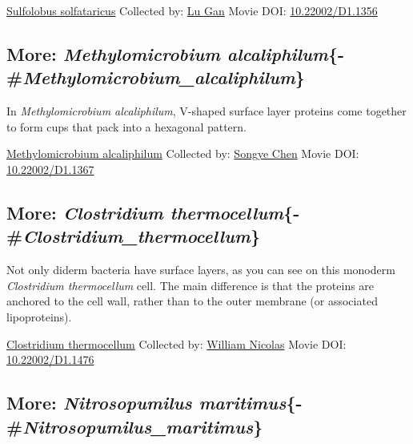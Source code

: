 \documentclass[]{tufte-book}
\begin{document}
\label{fig:2-7}\protect\hyperlink{tree}{Sulfolobus solfataricus} Collected by: \protect\hyperlink{lu_gan}{Lu Gan} Movie DOI: \href{https://doi.org/10.22002/D1.1356}{10.22002/D1.1356}

\hypertarget{more-methylomicrobium-alcaliphilum-methylomicrobium_alcaliphilum}{%
\subsection{\texorpdfstring{More: \emph{Methylomicrobium alcaliphilum}\{-\#\emph{Methylomicrobium\_alcaliphilum}\}}{More: Methylomicrobium alcaliphilum\{-\#Methylomicrobium\_alcaliphilum\}}}\label{more-methylomicrobium-alcaliphilum-methylomicrobium_alcaliphilum}}

In \emph{Methylomicrobium alcaliphilum}, V-shaped surface layer proteins come together to form cups that pack into a hexagonal pattern.



\hypertarget{htmlwidget-3ed617eb24cde7c86ec5}{}

\label{fig:2-7a}\protect\hyperlink{tree}{Methylomicrobium alcaliphilum} Collected by: \protect\hyperlink{songye_chen}{Songye Chen} Movie DOI: \href{https://doi.org/10.22002/D1.1367}{10.22002/D1.1367}

\hypertarget{more-clostridium-thermocellum-clostridium_thermocellum}{%
\subsection{\texorpdfstring{More: \emph{Clostridium thermocellum}\{-\#\emph{Clostridium\_thermocellum}\}}{More: Clostridium thermocellum\{-\#Clostridium\_thermocellum\}}}\label{more-clostridium-thermocellum-clostridium_thermocellum}}

Not only diderm bacteria have surface layers, as you can see on this monoderm \emph{Clostridium thermocellum} cell. The main difference is that the proteins are anchored to the cell wall, rather than to the outer membrane (or associated lipoproteins).



\hypertarget{htmlwidget-c2640723b2849eff1dcf}{}

\label{fig:2-7b}\protect\hyperlink{tree}{Clostridium thermocellum} Collected by: \protect\hyperlink{william_nicolas}{William Nicolas} Movie DOI: \href{https://doi.org/10.22002/D1.1476}{10.22002/D1.1476}

\hypertarget{more-nitrosopumilus-maritimus-nitrosopumilus_maritimus}{%
\subsection{\texorpdfstring{More: \emph{Nitrosopumilus maritimus}\{-\#\emph{Nitrosopumilus\_maritimus}\}}{More: Nitrosopumilus maritimus\{-\#Nitrosopumilus\_maritimus\}}}\label{more-nitrosopumilus-maritimus-nitrosopumilus_maritimus}}
\end{document}
